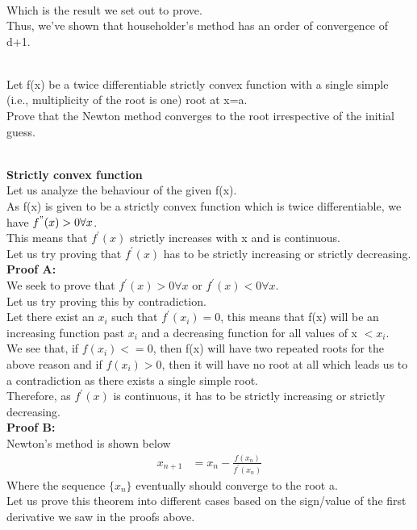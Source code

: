 \documentclass[letterpaper]{exam}
\begin{document}
\begin{questions}
\begin{solution}
\begin{align*}
\end{align*}
Which is the result we set out to prove. \\
Thus, we've shown that householder's method has an order of convergence of d+1.
\end{solution}
\\
Let f(x) be a twice differentiable strictly convex function with a single simple (i.e., multiplicity of the root is one) root at x=a.\\
Prove that the Newton method converges to the root irrespective of the initial guess.
\begin{solution}
\\
\textbf{Strictly convex function}\\
Let us analyze the behaviour of the given f(x).\\
As f(x) is given to be a strictly convex function which is twice differentiable, we have $f^{"}(x) > 0 \forall x$.\\
This means that $f^{'}(x)$ strictly increases with x and is continuous.\\
Let us try proving that $f^{'}(x)$ has to be strictly increasing or strictly decreasing.\\
\textbf{Proof A:}\\
We seek to prove that $f^{'}(x) > 0 \forall x$ or $f^{'}(x) < 0 \forall x$.\\
Let us try proving this by contradiction.\\
Let there exist an $x_i$ such that $f^{'}(x_i) = 0$, this means that f(x) will be an increasing function past $x_i$ and a decreasing function for all values of x $ < x_i$.\\
We see that, if $f(x_i) <= 0 $, then f(x) will have two repeated roots for the above reason and if $f(x_i) > 0$, then it will have no root at all which leads us to a contradiction as there exists a single simple root.\\
Therefore, as $f^{'}(x)$ is continuous, it has to be strictly increasing or strictly decreasing.\\
\textbf{Proof B:}\\
Newton's method is shown below
\begin{align}\label{N}
    x_{n+1} &= x_{n} -\frac{f(x_n)}{f^{'}(x_n)}
\end{align}
Where the sequence $\{x_n\}$ eventually should converge to the root a.\\
Let us prove this theorem into different cases based on the sign/value of the first derivative we saw in the proofs above.

\end{solution}
\end{questions}
\end{document}
